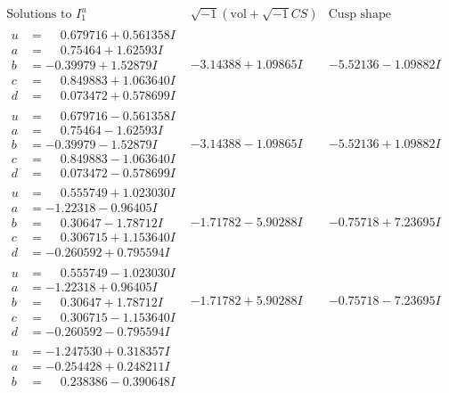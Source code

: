\documentclass[1p]{elsarticle_modified}
\theoremstyle{definition}
\newcommand{\I}{\sqrt{-1}}
\begin{document}
$$\begin{array}{c|c|c}  
\text{Solutions to }I^u_{1}& \I (\text{vol} + \sqrt{-1}CS) & \text{Cusp shape}\\
 \hline 
\begin{aligned}
u &= \phantom{-}0.679716 + 0.561358 I \\
a &= \phantom{-}0.75464 + 1.62593 I \\
b &= -0.39979 + 1.52879 I \\
c &= \phantom{-}0.849883 + 1.063640 I \\
d &= \phantom{-}0.073472 + 0.578699 I\end{aligned}
 & -3.14388 + 1.09865 I & -5.52136 - 1.09882 I \\ \hline\begin{aligned}
u &= \phantom{-}0.679716 - 0.561358 I \\
a &= \phantom{-}0.75464 - 1.62593 I \\
b &= -0.39979 - 1.52879 I \\
c &= \phantom{-}0.849883 - 1.063640 I \\
d &= \phantom{-}0.073472 - 0.578699 I\end{aligned}
 & -3.14388 - 1.09865 I & -5.52136 + 1.09882 I \\ \hline\begin{aligned}
u &= \phantom{-}0.555749 + 1.023030 I \\
a &= -1.22318 - 0.96405 I \\
b &= \phantom{-}0.30647 - 1.78712 I \\
c &= \phantom{-}0.306715 + 1.153640 I \\
d &= -0.260592 + 0.795594 I\end{aligned}
 & -1.71782 - 5.90288 I & -0.75718 + 7.23695 I \\ \hline\begin{aligned}
u &= \phantom{-}0.555749 - 1.023030 I \\
a &= -1.22318 + 0.96405 I \\
b &= \phantom{-}0.30647 + 1.78712 I \\
c &= \phantom{-}0.306715 - 1.153640 I \\
d &= -0.260592 - 0.795594 I\end{aligned}
 & -1.71782 + 5.90288 I & -0.75718 - 7.23695 I \\ \hline\begin{aligned}
u &= -1.247530 + 0.318357 I \\
a &= -0.254428 + 0.248211 I \\
b &= \phantom{-}0.238386 - 0.390648 I \\

\end{aligned}
\end{array}$$
\end{document}
